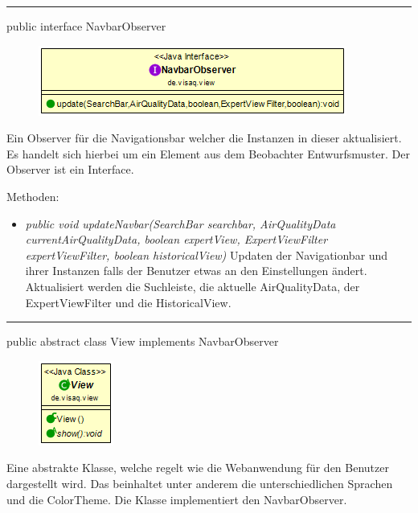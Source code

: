 \rule{\textwidth}{0.4pt}
public interface NavbarObserver

\begin{minipage}{0.4\textwidth}
    \begin{figure}[H]
        \includegraphics[scale = 0.5]{media/frontend/view/de.view/NavbarObserver_Class.png}
    \end{figure}
\end{minipage} \hfill
\begin{minipage}{0.4\textwidth}
    Ein Observer für die Navigationsbar welcher die Instanzen in dieser aktualisiert. Es handelt sich hierbei um ein Element aus dem Beobachter Entwurfsmuster. Der Observer ist ein Interface.
\end{minipage}

Methoden:
\begin{itemize}
    \item \emph{public void updateNavbar(SearchBar searchbar, AirQualityData currentAirQualityData,
              boolean expertView, ExpertViewFilter expertViewFilter, boolean historicalView)} Updaten der Navigationbar und ihrer Instanzen falls der Benutzer etwas an den Einstellungen ändert. Aktualisiert werden die Suchleiste, die aktuelle AirQualityData, der ExpertViewFilter und die HistoricalView.
\end{itemize}

\rule{\textwidth}{0.4pt}
public abstract class View implements NavbarObserver

\begin{minipage}{0.3\textwidth}
    \begin{figure}[H]
        \includegraphics[scale = 0.7]{media/frontend/view/de.view/View_Class.png}
    \end{figure}
\end{minipage} \hfill
\begin{minipage}{0.6\textwidth}
    Eine abstrakte Klasse, welche regelt wie die Webanwendung für den Benutzer dargestellt wird. Das beinhaltet unter anderem die unterschiedlichen Sprachen und die ColorTheme. Die Klasse implementiert den NavbarObserver.
\end{minipage}

